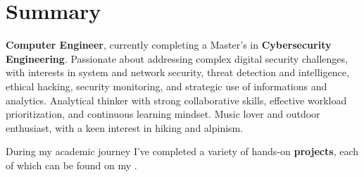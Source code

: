
\section{Summary}

    \begin{onecolentry}
        \textbf{Computer Engineer}, currently completing a Master's in \textbf{Cybersecurity Engineering}. 
        Passionate about addressing complex digital security challenges, with interests in system and network security, threat detection and intelligence, ethical hacking, security monitoring, and strategic use of informations and analytics.
        Analytical thinker with strong collaborative skills, effective workload prioritization, and continuous learning mindset.
        Music lover and outdoor enthusiast, with a keen interest in hiking and alpinism.
    \end{onecolentry}

    \vspace{0.1 cm} %

    \begin{onecolentry}
        During my academic journey I've completed a variety of hands-on \textbf{projects}, each of which can be found on my \hspace{0em} \mbox{}.
    \end{onecolentry}
